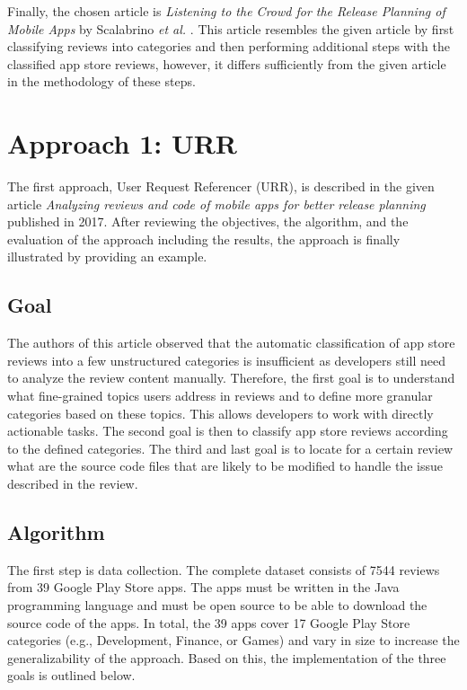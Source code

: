 Finally, the chosen article is \textit{Listening to the Crowd for the Release Planning of Mobile Apps} by Scalabrino \textit{et al.} \cite{Scalabrino.2019}. This article resembles the given article by first classifying reviews into categories and then performing additional steps with the classified app store reviews, however, it differs sufficiently from the given article in the methodology of these steps.

\section{Approach 1: URR}\label{sec:02_approach_1_urr}

The first approach, User Request Referencer (URR), is described in the given article \textit{Analyzing reviews and code of mobile apps for better release planning} \cite{Ciurumelea.2017} published in 2017. After reviewing the objectives, the algorithm, and the evaluation of the approach including the results, the approach is finally illustrated by providing an example. 
\subsection{Goal}

The authors of this article observed that the automatic classification of app store reviews into a few unstructured categories is insufficient as developers still need to analyze the review content manually. Therefore, the first goal is to understand what fine-grained topics users address in reviews and to define more granular categories based on these topics. This allows developers to work with directly actionable tasks. The second goal is then to classify app store reviews according to the defined categories. The third and last goal is to locate for a certain review what are the source code files that are likely to be modified to handle the issue described in the review.

\subsection{Algorithm}

The first step is data collection. The complete dataset consists of 7544 reviews from 39 Google Play Store apps. The apps must be written in the Java programming language and must be open source to be able to download the source code of the apps. In total, the 39 apps cover 17 Google Play Store categories (e.g., Development, Finance, or Games) and vary in size to increase the generalizability of the approach. Based on this, the implementation of the three goals is outlined below.


